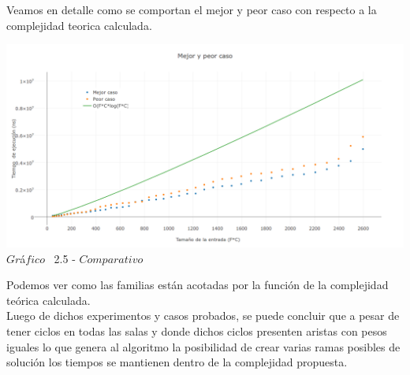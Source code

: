   
Veamos en detalle como se comportan el mejor y peor caso con respecto a la complejidad teorica calculada.\\

\vspace*{0.3cm} \vspace*{0.3cm}
  \begin{center}
\includegraphics[scale=0.35]{./EJ2/MejorYPeorCaso.png}
 {$Gr$\'a$fico$ \ 2.5 - $Comparativo$}
  \end{center}
  \vspace*{0.3cm}
    
  
Podemos ver como las familias est\'an acotadas por la funci\'on de la complejidad te\'orica calculada.\\
  
Luego de dichos experimentos y casos probados, se puede concluir que a pesar de tener ciclos en todas las salas y donde dichos ciclos presenten aristas con pesos iguales lo que genera al algoritmo la posibilidad de crear varias ramas posibles de soluci\'on los tiempos se mantienen dentro de la complejidad propuesta.\\

